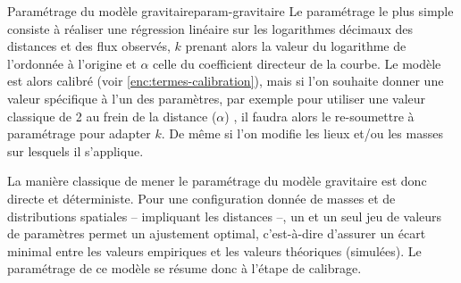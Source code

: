 \begin{encadre}{Paramétrage du modèle gravitaire}{param-gravitaire}
Le paramétrage le plus simple consiste à réaliser une régression linéaire sur les logarithmes décimaux des distances et des flux observés, $k$ prenant alors la valeur du logarithme de l'ordonnée à l'origine et $\alpha$ celle du coefficient directeur de la courbe.	
Le modèle est alors calibré (voir \cref{enc:termes-calibration}), mais si l'on souhaite donner une valeur spécifique à l'un des paramètres, par exemple pour utiliser une valeur classique de 2 au frein de la distance ($\alpha$) \autocite{pumain_modegravitaire_2004}, il faudra alors le re-soumettre à paramétrage pour adapter $k$. De même si l'on modifie les lieux et/ou les masses sur lesquels il s'applique.
\end{encadre}

La manière classique de mener le paramétrage du modèle gravitaire est donc directe et déterministe.
Pour une configuration donnée de masses et de distributions spatiales -- impliquant les distances --, un et un seul jeu de valeurs de paramètres permet un ajustement optimal, c'est-à-dire d'assurer un écart minimal entre les valeurs empiriques et les valeurs théoriques (simulées).
Le paramétrage de ce modèle se résume donc à l'étape de calibrage.



